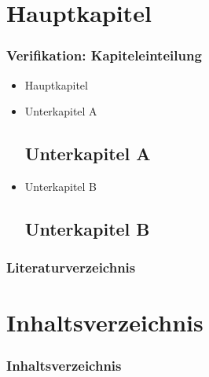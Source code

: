 \documentclass[]{beamer}
\begin{document}
\section{Hauptkapitel}
\begin{frame}
  \frametitle{Verifikation: Kapiteleinteilung}
      \begin{itemize}
        \item Hauptkapitel
        \item Unterkapitel A\subsection{Unterkapitel A}
        \item {\tiny Unterkapitel B\subsection{Unterkapitel B}}
      \end{itemize}
\end{frame}

\begin{frame}
  \frametitle{Literaturverzeichnis}
  \printbibliography
\end{frame}

\section{Inhaltsverzeichnis}

  \begin{frame}
    \frametitle{Inhaltsverzeichnis}
    \tableofcontents
  \end{frame}
\end{document}

